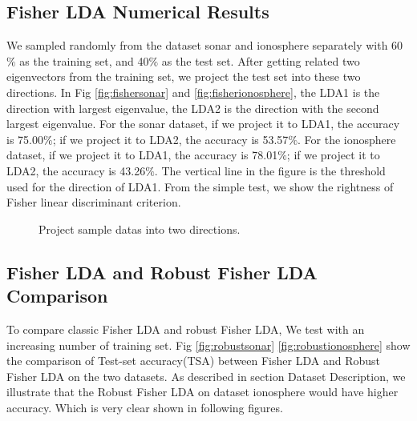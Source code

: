 \documentclass{article} %
\begin{document}
\subsection{Fisher LDA Numerical Results}
We sampled randomly from the dataset sonar and ionosphere separately with 60$\%$ as the training set, and 40$\%$ as the test set. After getting related two eigenvectors from the training set, we project the test set into these two directions. In Fig \ref{fig:fishersonar} and \ref{fig:fisherionosphere}, the LDA1 is the direction with largest eigenvalue, the LDA2 is the direction with the second largest eigenvalue. For the sonar dataset, if we project it to LDA1, the accuracy is 75.00$\%$; if we project it to LDA2, the accuracy is 53.57$\%$. For the ionosphere dataset, if we project it to LDA1, the accuracy is 78.01$\%$; if we project it to LDA2, the accuracy is 43.26$\%$. The vertical line in the figure is the threshold used for the direction of LDA1. From the simple test, we show the rightness of Fisher linear discriminant criterion.

\begin{figure}[h]
\center
{}
\hfill
{}
\caption{Project sample datas into two directions.}
\end{figure}


\subsection{Fisher LDA and Robust Fisher LDA Comparison}
To compare classic Fisher LDA and robust Fisher LDA, We test with an increasing number of training set. Fig \ref{fig:robustsonar} \ref{fig:robustionosphere} show the comparison of Test-set accuracy(TSA) between Fisher LDA and Robust Fisher LDA on the two datasets. As described in section Dataset Description, we illustrate that the Robust Fisher LDA on dataset ionosphere would have higher accuracy. Which is very clear shown in following figures.
\end{document}
